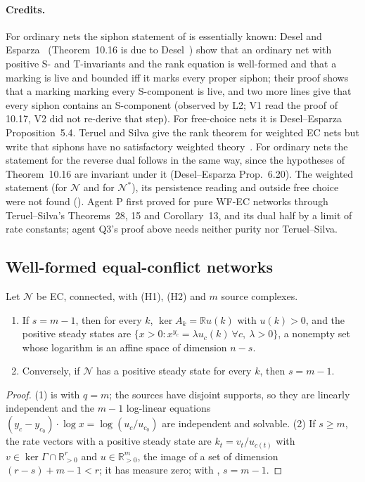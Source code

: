 \documentclass[11pt,a4paper]{report}
\newcommand{\Net}{\mathcal{N}}
\newcommand{\Nd}{\mathcal{N}^{*}}
\newcommand{\Rp}{\mathbb{R}_{>0}}
\begin{document}
\paragraph{Credits.} For ordinary nets the siphon statement of  is essentially known: Desel and
Esparza~\autocite[Thms~10.16--10.17]{DeselEsparza1995} (Theorem~10.16 is due to Desel~\autocite{Desel1994}) show that an ordinary net
with positive S- and T-invariants and the rank equation is well-formed and that a marking is live and bounded iff it
marks every proper siphon; their proof shows that a marking marking every S-component is live, and two more lines
give that every siphon contains an S-component (observed by L2; V1 read the proof of 10.17, V2 did not re-derive that
step). For free-choice nets it is Desel--Esparza Proposition~5.4. Teruel and Silva give the rank theorem for weighted
EC nets but write that siphons have no satisfactory weighted theory~\autocite[pp.~272, 296]{TeruelSilva1996}. For
ordinary nets the statement for the reverse dual follows in the same way, since the hypotheses of Theorem~10.16 are
invariant under it (Desel--Esparza Prop.~6.20). The weighted statement (for \(\Net\) and for \(\Nd\)), its persistence
reading and  outside free choice were not found (). Agent P first proved  for pure WF-EC networks through
Teruel--Silva's Theorems~28, 15 and Corollary~13, and its dual half by a limit of rate constants; agent Q3's proof
above needs neither purity nor Teruel--Silva.

\subsection{Well-formed equal-conflict networks}

\begin{theorem}\label{thm:T}
Let \(\Net\) be EC, connected, with (H1), (H2) and \(m\) source complexes.
\begin{enumerate}
\item If \(s=m-1\), then for every \(k\), \(\ker A_k=\mathbb{R}u(k)\) with \(u(k)>0\), and the positive steady states
are \(\{x>0:x^{y_c}=\lambda u_c(k)\ \forall c,\ \lambda>0\}\), a nonempty set whose logarithm is an affine space of
dimension \(n-s\).
\item Conversely, if \(\Net\) has a positive steady state for every \(k\), then \(s=m-1\).
\end{enumerate}
\end{theorem}
\begin{proof}
(1) is  with \(q=m\); the sources have disjoint supports, so they are linearly independent and the
\(m-1\) log-linear equations \((y_c-y_{c_0})\cdot\log x=\log(u_c/u_{c_0})\) are independent and solvable. (2) If
\(s\ge m\), the rate vectors with a positive steady state are \(k_t=v_t/u_{c(t)}\) with \(v\in\ker\Gamma\cap\Rp^r\) and
\(u\in\Rp^m\), the image of a set of dimension \((r-s)+m-1<r\); it has measure zero; with , \(s=m-1\).
\end{proof}
\end{document}
